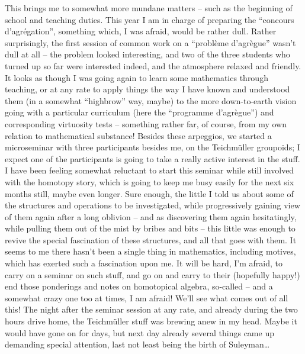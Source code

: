 This brings me to somewhat more mundane matters -- such as the
beginning of school and teaching duties. This year I am in charge of
preparing the ``concours d'agrégation'', something which, I was afraid, would be rather
dull. Rather surprisingly, the first session of common work on a
``problème d'agrègue'' wasn't dull at all -- the problem looked
interesting, and two of the three students who turned up so far were
interested indeed, and the atmosphere relaxed and friendly. It looks
as though I was going again to learn some mathematics through
teaching, or at any rate to apply things the way I have known and
understood them (in a somewhat ``highbrow'' way, maybe) to the more
down-to-earth vision going with a particular curriculum (here the
``programme d'agrègue'') and corresponding virtuosity tests --
something rather far, of course, from my own relation to mathematical
substance! Besides these arpeggios, we started a microseminar with
three participants besides me, on the Teichmüller groupoids; I expect
one of the participants is going to take a really active interest in
the stuff. I have been feeling somewhat reluctant to start this
seminar while still involved with the homotopy story, which is going
to keep me busy easily for the next six months still, maybe even
longer. Sure enough, the little I told us about some of the structures
and operations to be investigated, while progressively gaining view of
them again after a long oblivion -- and as discovering them again
hesitatingly, while pulling them out of the mist by bribes and bits --
this little was enough to revive the special fascination of these
structures, and all that goes with them. It seems to me
there hasn't been a single thing in mathematics, including
motives,
which has exerted such a fascination upon me. It will be hard, I'm
afraid, to carry on a seminar on such stuff, and go on and carry to
their (hopefully happy!) end those ponderings and notes on homotopical
algebra, so-called -- and a somewhat crazy one too at times, I am
afraid! We'll see what comes out of all this! The night after the
seminar session at any rate, and already during the two hours drive
home, the Teichmüller stuff was brewing anew in my head. Maybe it
would have gone on for days, but next day already several things came
up demanding special attention, last not least being the birth of
Suleyman\dots 

\bigbreak{}

